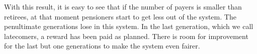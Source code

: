 \begin{table}[hbt!]
\centering
{}
\end{table}

With this result, it is easy to see that if the number of payers is smaller than retirees, at that moment pensioners start to get less out of the system. The penultimate generations lose in this system. In the last generation, which we call latecomers, a reward has been paid as planned. There is room for improvement for the last but one generations to make the system even fairer.

